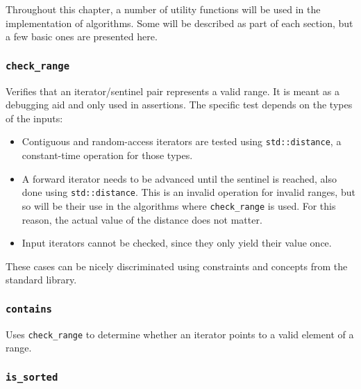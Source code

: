 Throughout this chapter, a number of utility functions will be used in the
implementation of algorithms.  Some will be described as part of each section,
but a few basic ones are presented here.

\subsubsection{\texttt{check\_range}}

Verifies that an iterator/sentinel pair represents a valid range.  It is meant
as a debugging aid and only used in assertions.  The specific test depends on
the types of the inputs:

\begin{itemize}
    \item
        Contiguous and random-access iterators are tested using
        \texttt{std::distance}, a constant-time operation for those types.
    \item
        A forward iterator needs to be advanced until the sentinel is reached,
        also done using \texttt{std::distance}.  This is an invalid operation
        for invalid ranges, but so will be their use in the algorithms where
        \texttt{check\_range} is used.  For this reason, the actual value of the
        distance does not matter.
    \item
        Input iterators cannot be checked, since they only yield their value
        once.
\end{itemize}

These cases can be nicely discriminated using constraints and concepts from the
standard library.


\vspace{-\baselineskip}

\subsubsection{\texttt{contains}}

Uses \texttt{check\_range} to determine whether an iterator points to a valid
element of a range.


\vspace{-\baselineskip}

\subsubsection{\texttt{is\_sorted}}

